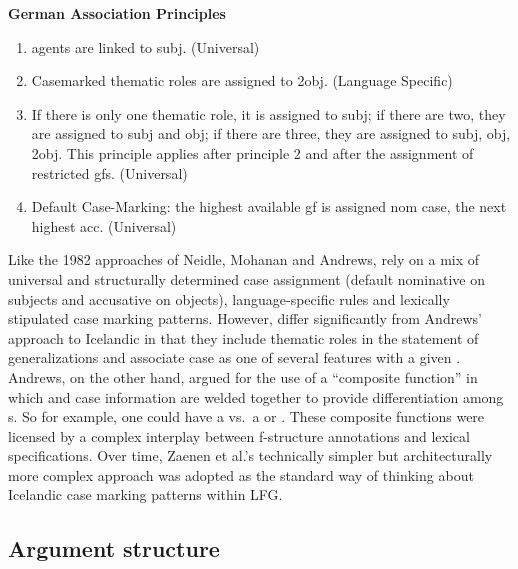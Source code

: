 \documentclass[output=paper,hidelinks]{langscibook}
\begin{document}

\ea \label{ger-principle}
{\bf German Association Principles}

\begin{enumerate}

\item {\sc agents} are linked to {\sc subj}. (Universal)

\item Casemarked {\sc thematic roles} are assigned to
 {\sc 2obj}.  (Language Specific)

\item If there is only one thematic role, it is assigned to {\sc
 subj}; if there are two, they are assigned to {\sc subj} and {\sc
 obj}; if there are three, they are assigned to {\sc subj}, {\sc obj},
 {\sc 2obj}. This principle applies after principle 2 and after the
assignment of restricted {\sc gf}s. (Universal)

\item Default Case-Marking:  the highest available {\sc gf} is
 assigned {\sc nom} case, the next highest {\sc acc}. (Universal)

\end{enumerate}
\z
Like the 1982 approaches of Neidle, Mohanan and Andrews, \citet{ZMT85:Case} rely
on a mix of universal and structurally determined case assignment (default
nominative on subjects and accusative on objects), language-specific rules and
lexically stipulated case marking patterns.  However, \citet{ZMT85:Case} differ
significantly from
Andrews' approach to Icelandic in that they include thematic roles in the
statement of generalizations and associate case as one of several features with
a given \GF. Andrews, on the other hand, argued for the use of a ``composite
function''  in which \GF and case information are welded together to provide
differentiation among {\GF}s.  So for example,  one could have a {\SUBJ \DAT}
vs.~a  {\SUBJ \ACC} or {\OBJ \ACC}.  These 
composite functions were licensed by a complex interplay between f-structure
annotations and lexical specifications.  Over time, Zaenen et al.'s technically simpler but
architecturally more complex approach was adopted as the standard way of thinking
about Icelandic case marking patterns within LFG. 

\subsection{Argument structure}
\end{document}
